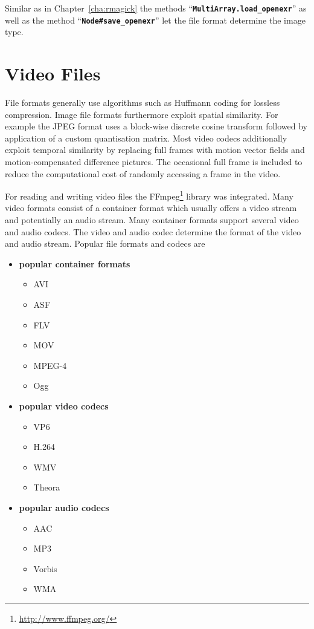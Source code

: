 \documentclass[12pt,a4paper,oneside,openright]{book}
\newcommand{\Eg}{For ex\-am\-ple }
\newcommand{\cha}[1]{Chapter~\ref{cha:#1}}
\newcommand{\code}[1]{``\texttt{\textbf{\textcolor{codegray}{\small{#1}}}}''}
\begin{document}
\begin{CJK}{UTF8}{}

Similar as in \cha{rmagick} the methods \code{MultiArray.load\_openexr} as well as the method \code{Node\#save\_openexr} let the file format determine the image type.

\section{Video Files}\label{cha:ffmpeg}
File formats generally use algorithms such as Huffmann coding for lossless compression. Image file formats furthermore exploit spatial similarity. \Eg the \ac{JPEG} format uses a block-wise discrete cosine transform followed by application of a custom quantisation matrix. Most video codecs additionally exploit temporal similarity by replacing full frames with motion vector fields and motion-compensated difference pictures. The occasional full frame is included to reduce the computational cost of randomly accessing a frame in the video.

For reading and writing video files the FFmpeg\footnote{\url{http://www.ffmpeg.org/}} library was integrated. Many video formats consist of a container format which usually offers a video stream and potentially an audio stream. Many container formats support several video and audio codecs. The video and audio codec determine the format of the video and audio stream. Popular file formats and codecs are
\begin{itemize}
\item \textbf{popular container formats}
  \begin{itemize}
  \item \acf{AVI}
  \item \acf{ASF}
  \item \acf{FLV}
  \item \acf{MOV}
  \item \acf{MPEG-4}
  \item \acf{Ogg}
  \end{itemize}
\item \textbf{popular video codecs}
  \begin{itemize}
  \item \acf{VP6}
  \item \acf{H.264}
  \item \acf{WMV}
  \item \acf{Theora}
  \end{itemize}
\item \textbf{popular audio codecs}
  \begin{itemize}
  \item \acf{AAC}
  \item \acf{MP3}
  \item \acf{Vorbis}
  \item \acf{WMA}
  \end{itemize}
\end{itemize}


\end{CJK}
\end{document}
